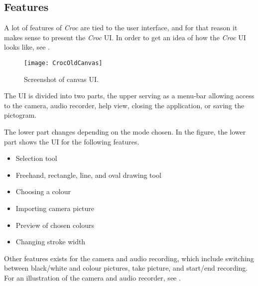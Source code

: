 \subsection{Features}
A lot of features of \textit{Croc} are tied to the user interface, and for that reason it makes sense to present the \textit{Croc} UI.
In order to get an idea of how the \textit{Croc} UI looks like, see . 

\begin{figure}[h]
     \centering
     \texttt{[image: CrocOldCanvas]}
     \caption{Screenshot of canvas UI.}
     \label{fig:croc-old-canvas}
\end{figure}

The UI is divided into two parts, the upper serving as a menu-bar allowing access to the camera, audio recorder, help view, closing the application, or saving the pictogram.

The lower part changes depending on the mode chosen.
In the figure, the lower part shows the UI for the following features.

\begin{itemize}
     \item Selection tool
     \item Freehand, rectangle, line, and oval drawing tool
     \item Choosing a colour
     \item Importing camera picture
     \item Preview of chosen colours
     \item Changing stroke width
\end{itemize}

Other features exists for the camera and audio recording, which include switching between black/white and colour pictures, take picture, and start/end recording.
For an illustration of the camera and audio recorder, see .